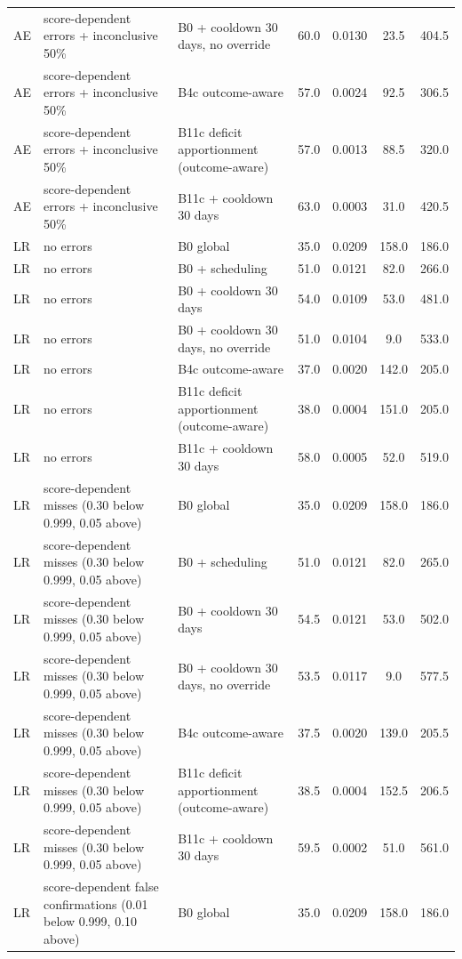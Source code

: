 \begin{longtable}{lp{5.2cm}p{4.4cm}cccc}
AE & score-dependent errors + inconclusive 50\% & B0 + cooldown 30 days, no override & 60.0 & 0.0130 & 23.5 & 404.5 \\
AE & score-dependent errors + inconclusive 50\% & B4c outcome-aware & 57.0 & 0.0024 & 92.5 & 306.5 \\
AE & score-dependent errors + inconclusive 50\% & B11c deficit apportionment (outcome-aware) & 57.0 & 0.0013 & 88.5 & 320.0 \\
AE & score-dependent errors + inconclusive 50\% & B11c + cooldown 30 days & 63.0 & 0.0003 & 31.0 & 420.5 \\
LR & no errors & B0 global & 35.0 & 0.0209 & 158.0 & 186.0 \\
LR & no errors & B0 + scheduling & 51.0 & 0.0121 & 82.0 & 266.0 \\
LR & no errors & B0 + cooldown 30 days & 54.0 & 0.0109 & 53.0 & 481.0 \\
LR & no errors & B0 + cooldown 30 days, no override & 51.0 & 0.0104 & 9.0 & 533.0 \\
LR & no errors & B4c outcome-aware & 37.0 & 0.0020 & 142.0 & 205.0 \\
LR & no errors & B11c deficit apportionment (outcome-aware) & 38.0 & 0.0004 & 151.0 & 205.0 \\
LR & no errors & B11c + cooldown 30 days & 58.0 & 0.0005 & 52.0 & 519.0 \\
LR & score-dependent misses (0.30 below 0.999, 0.05 above) & B0 global & 35.0 & 0.0209 & 158.0 & 186.0 \\
LR & score-dependent misses (0.30 below 0.999, 0.05 above) & B0 + scheduling & 51.0 & 0.0121 & 82.0 & 265.0 \\
LR & score-dependent misses (0.30 below 0.999, 0.05 above) & B0 + cooldown 30 days & 54.5 & 0.0121 & 53.0 & 502.0 \\
LR & score-dependent misses (0.30 below 0.999, 0.05 above) & B0 + cooldown 30 days, no override & 53.5 & 0.0117 & 9.0 & 577.5 \\
LR & score-dependent misses (0.30 below 0.999, 0.05 above) & B4c outcome-aware & 37.5 & 0.0020 & 139.0 & 205.5 \\
LR & score-dependent misses (0.30 below 0.999, 0.05 above) & B11c deficit apportionment (outcome-aware) & 38.5 & 0.0004 & 152.5 & 206.5 \\
LR & score-dependent misses (0.30 below 0.999, 0.05 above) & B11c + cooldown 30 days & 59.5 & 0.0002 & 51.0 & 561.0 \\
LR & score-dependent false confirmations (0.01 below 0.999, 0.10 above) & B0 global & 35.0 & 0.0209 & 158.0 & 186.0 \\

\end{longtable}
